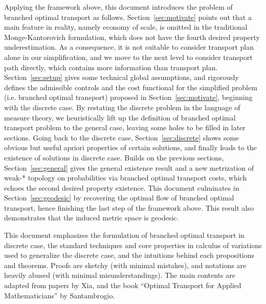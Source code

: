 \documentclass[fleqn]{article}
\theoremstyle{definition}
\theoremstyle{remark}
\begin{document}
\par
Applying the framework above, this document introduces the problem of branched optimal transport as follows. Section~\ref{sec:motivate} points out that a main feature in reality, namely economy of scale, is omitted in the traditional Monge-Kantorovich formulation, which does not have the fourth desired property underestimation. As a consequence, it is not suitable to consider transport plan alone in our simplification, and we move to the next level to consider transport path directly, which contains more information than transport plan. Section~\ref{sec:setup} gives some technical global assumptions, and rigorously defines the admissible controls and the cost functional for the simplified problem (i.e. branched optimal transport) proposed in Section~\ref{sec:motivate}, beginning with the discrete case. By restating the discrete problem in the language of measure theory, we heuristically lift up the definition of branched optimal transport problem to the general case, leaving some holes to be filled in later sections. Going back to the discrete case, Section~\ref{sec:discrete} shows some obvious but useful apriori properties of certain solutions, and finally leads to the existence of solutions in discrete case. Builds on the previous sections, Section~\ref{sec:general} gives the general existence result and a new metrization of weak-* topology on probabilities via branched optimal transport costs, which echoes the second desired property existence. This document culminates in Section~\ref{sec:geodesic} by recovering the optimal flow of branched optimal transport, hence finishing the last step of the framework above. This result also demonstrates that the induced metric space is geodesic.

\par
This document emphasizes the formulation of branched optimal transport in discrete case, the standard techniques and core properties in calculus of variations used to generalize the discrete case, and the intuitions behind each propositions and theorems. Proofs are sketchy (with minimal mistakes), and notations are heavily abused (with minimal misunderstandings). The main contents are adapted from papers \cite{Xia2003a, Xia2015} by Xia, and the book ``Optimal Transport for Applied Mathematicians''\cite{OTAM} by Santambrogio.
\end{document}
